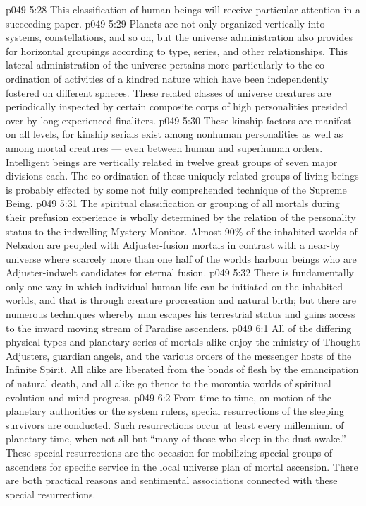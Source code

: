 \vs p049 5:28 This classification of human beings will receive particular attention in a succeeding paper.
\vs p049 5:29 \bibnobreakspace {} Planets are not only organized vertically into systems, constellations, and so on, but the universe administration also provides for horizontal groupings according to type, series, and other relationships. This lateral administration of the universe pertains more particularly to the co\hyp{}ordination of activities of a kindred nature which have been independently fostered on different spheres. These related classes of universe creatures are periodically inspected by certain composite corps of high personalities presided over by long\hyp{}experienced finaliters.
\vs p049 5:30 These kinship factors are manifest on all levels, for kinship serials exist among nonhuman personalities as well as among mortal creatures --- even between human and superhuman orders. Intelligent beings are vertically related in twelve great groups of seven major divisions each. The co\hyp{}ordination of these uniquely related groups of living beings is probably effected by some not fully comprehended technique of the Supreme Being.
\vs p049 5:31 \bibnobreakspace {} The spiritual classification or grouping of all mortals during their prefusion experience is wholly determined by the relation of the personality status to the indwelling Mystery Monitor. Almost 90\% of the inhabited worlds of Nebadon are peopled with Adjuster\hyp{}fusion mortals in contrast with a near\hyp{}by universe where scarcely more than one half of the worlds harbour beings who are Adjuster\hyp{}indwelt candidates for eternal fusion.
\vs p049 5:32 \bibnobreakspace {} There is fundamentally only one way in which individual human life can be initiated on the inhabited worlds, and that is through creature procreation and natural birth; but there are numerous techniques whereby man escapes his terrestrial status and gains access to the inward moving stream of Paradise ascenders.
\vs p049 6:1 All of the differing physical types and planetary series of mortals alike enjoy the ministry of Thought Adjusters, guardian angels, and the various orders of the messenger hosts of the Infinite Spirit. All alike are liberated from the bonds of flesh by the emancipation of natural death, and all alike go thence to the morontia worlds of spiritual evolution and mind progress.
\vs p049 6:2 From time to time, on motion of the planetary authorities or the system rulers, special resurrections of the sleeping survivors are conducted. Such resurrections occur at least every millennium of planetary time, when not all but “many of those who sleep in the dust awake.” These special resurrections are the occasion for mobilizing special groups of ascenders for specific service in the local universe plan of mortal ascension. There are both practical reasons and sentimental associations connected with these special resurrections.
